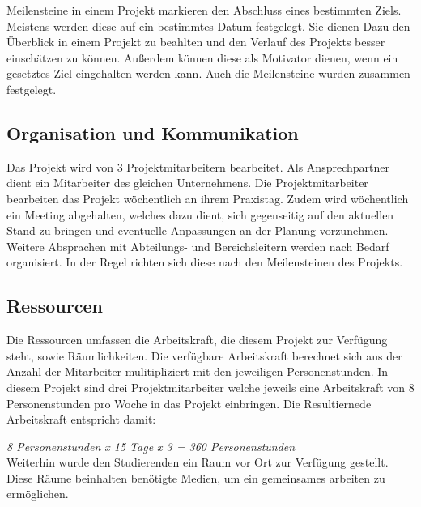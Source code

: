 \documentclass[ThesisDJ.tex]{subfiles}
\begin{document}
Meilensteine in einem Projekt markieren den Abschluss eines bestimmten Ziels. Meistens werden diese auf ein bestimmtes Datum festgelegt. Sie dienen Dazu den Überblick in einem Projekt zu beahlten und den Verlauf des Projekts besser einschätzen zu können. Außerdem können diese als Motivator dienen, wenn ein gesetztes Ziel eingehalten werden kann. 
Auch die Meilensteine wurden zusammen festgelegt.


\subsection{Organisation und Kommunikation}
Das Projekt wird von 3 Projektmitarbeitern bearbeitet. Als Ansprechpartner dient ein Mitarbeiter des gleichen Unternehmens. Die Projektmitarbeiter bearbeiten das Projekt wöchentlich an ihrem Praxistag. Zudem wird wöchentlich ein Meeting abgehalten, welches dazu dient, sich gegenseitig auf den aktuellen Stand zu bringen und eventuelle Anpassungen an der Planung vorzunehmen. Weitere Absprachen mit Abteilungs- und Bereichsleitern werden nach Bedarf organisiert. In der Regel richten sich diese nach den Meilensteinen des Projekts.  

\subsection{Ressourcen}

Die Ressourcen umfassen die Arbeitskraft, die diesem Projekt zur Verfügung steht, sowie Räumlichkeiten. 
Die verfügbare Arbeitskraft berechnet sich aus der Anzahl der Mitarbeiter mulitipliziert mit den jeweiligen Personenstunden.
In diesem Projekt sind drei Projektmitarbeiter welche jeweils eine Arbeitskraft von 8 Personenstunden pro Woche in das Projekt einbringen. 
Die Resultiernede Arbeitskraft entspricht damit:

		\emph{8 Personenstunden x 15 Tage x 3 = 360 Personenstunden}\\
Weiterhin wurde den Studierenden ein Raum vor Ort zur Verfügung gestellt. Diese Räume beinhalten benötigte Medien, um ein gemeinsames arbeiten zu ermöglichen.
\end{document}
